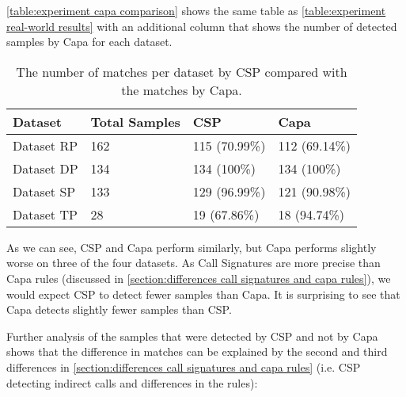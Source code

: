 \medskip

\autoref{table:experiment capa comparison} shows the same table as \autoref{table:experiment real-world results} with an additional column that shows the number of detected samples by Capa for each dataset.

\begin{table}[ht]
  \centering
  \begin{tabular}{l|lll}
      \hline
      Dataset     & Total Samples & CSP           & Capa          \\ \hline
      Dataset RP  & 162           & 115 (70.99\%) & 112 (69.14\%) \\ \hline
      Dataset DP  & 134           & 134 (100\%)   & 134 (100\%)   \\ \hline
      Dataset SP  & 133           & 129 (96.99\%) & 121 (90.98\%) \\ \hline
      Dataset TP  & 28            & 19  (67.86\%) & 18  (94.74\%) \\ \hline
  \end{tabular}
  \caption{The number of matches per dataset by CSP compared with the matches by Capa.}
  \label{table:experiment capa comparison}
\end{table}

As we can see, CSP and Capa perform similarly, but Capa performs slightly worse on three of the four datasets. As Call Signatures are more precise than Capa rules (discussed in \autoref{section:differences call signatures and capa rules}), we would expect CSP to detect fewer samples than Capa. It is surprising to see that Capa detects slightly fewer samples than CSP.

\medskip

Further analysis of the samples that were detected by CSP and not by Capa shows that the difference in matches can be explained by the second and third differences in \autoref{section:differences call signatures and capa rules} (i.e. CSP detecting indirect calls and differences in the rules):


